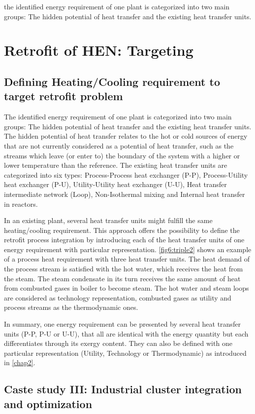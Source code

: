 the identified energy requirement of one plant is categorized into two main groups: The hidden potential of heat transfer and the existing heat transfer units. \section{Retrofit of HEN: Targeting}

\subsection{Defining Heating/Cooling requirement to target retrofit problem}
\label{subsec6:heattransinterface}
The identified energy requirement of one plant is categorized into two main groups: The hidden potential of heat transfer and the existing heat transfer units. The hidden potential of heat transfer relates to the hot or cold sources of energy that are not currently considered as a potential of heat transfer, such as the streams which leave (or enter to) the boundary of the system with a higher or lower temperature than the reference. The existing heat transfer units are categorized into six types: Process-Process heat exchanger (P-P), Process-Utility heat exchanger (P-U), Utility-Utility heat exchanger (U-U), Heat transfer intermediate network (Loop), Non-Isothermal mixing and Internal heat transfer in reactors. 

In an existing plant, several heat transfer units might fulfill the same heating/cooling requirement. This approach offers the possibility to define the retrofit process integration by introducing each of the heat transfer units of one energy requirement with particular representation. \cref{fig6:triple2} shows an example of a process heat requirement with three heat transfer units. The heat demand of the process stream is satisfied with the hot water, which receives the heat from the steam. The steam condensate in its turn receives the same amount of heat from combusted gases in boiler to become steam. The hot water and steam loops are considered as technology representation, combusted gases as utility and process streams as the thermodynamic ones. 

In summary, one energy requirement can be presented by several heat transfer units (P-P, P-U or U-U), that all are identical with the energy quantity but each differentiates through its exergy content. They can also be defined with one particular representation (Utility, Technology or Thermodynamic) as introduced in \cref{chap2}.


\subsection{Caste study III: Industrial cluster integration and optimization}